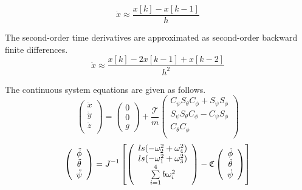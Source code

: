 \begin{equation}
\dot x \approx \frac{x[k] - x[k-1]}{h}
\end{equation}

The second-order time derivatives are approximated as second-order backward finite differences.
\begin{equation}
\ddot x \approx \frac{x[k] -2 x[k-1] + x[k-2]}{h^2}
\end{equation}

The continuous system equations are given as follows.
\begin{equation}
    \left(
        \begin{array}{c}
           \ddot{x}\\
           \ddot{y}\\
           \ddot{z}\\
        \end{array}
    \right)
    = \left(
       \begin{array}{c}
        0\\
        0\\
        g
      \end{array}
    \right)
    +\frac{\mathcal{T}}{m}
     \left(
        \begin{array}{c}
             C_{\psi}S_{\theta}C_{\phi} + S_{\psi}S_{\phi} \\
             S_{\psi}S_{\theta}C_{\phi} - C_{\psi}S_{\phi} \\
             C_{\theta} C_{\phi} \\
        \end{array}
    \right)
\end{equation}
\begin{equation}
    \left(
        \begin{array}{c}
           \ddot{\phi}\\
           \ddot{\theta}\\
           \ddot{\psi}\\
        \end{array}
    \right) = J^{-1}
    \left[ \left(
        \begin{array}{c}
            l s (-\omega_2^2 + \omega_4^2)\\
            l s (-\omega_1^2 + \omega_3^2)\\
            \sum \limits_{i=1}^4 b \omega_i^2\\
        \end{array}
    \right) -
    \mathfrak{C}
    \left(
        \begin{array}{c}
           \dot{\phi}\\
           \dot{\theta}\\
           \dot{\psi}\\
        \end{array}
    \right)
    \right]
\end{equation}

